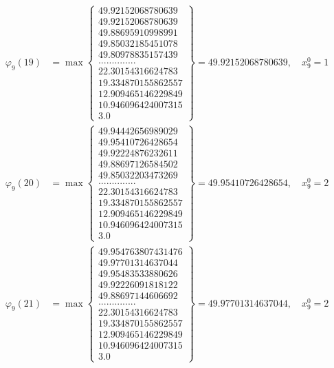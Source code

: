 \documentclass{article}
\begin{document}
\begin{align*}
  
  
  
\varphi_{9}(19) &= \max \left\{ \begin{array}{c}
49.92152068780639 \\
 49.92152068780639 \\
 49.88695910998991 \\
 49.85032185451078 \\
 49.80978835157439 \\
 .............. \\
 22.30154316624783 \\
 19.334870155862557 \\
 12.909465146229849 \\
 10.946096424007315 \\
 3.0
\end{array} \right\} = 49.92152068780639, \quad x_{9}^0 = 1\\
  
  
  
  
\varphi_{9}(20) &= \max \left\{ \begin{array}{c}
49.94442656989029 \\
 49.95410726428654 \\
 49.92224876232611 \\
 49.88697126584502 \\
 49.85032203473269 \\
 .............. \\
 22.30154316624783 \\
 19.334870155862557 \\
 12.909465146229849 \\
 10.946096424007315 \\
 3.0
\end{array} \right\} = 49.95410726428654, \quad x_{9}^0 = 2\\
  
  
  
  
\varphi_{9}(21) &= \max \left\{ \begin{array}{c}
49.954763807431476 \\
 49.97701314637044 \\
 49.95483533880626 \\
 49.92226091818122 \\
 49.88697144606692 \\
 .............. \\
 22.30154316624783 \\
 19.334870155862557 \\
 12.909465146229849 \\
 10.946096424007315 \\
 3.0
\end{array} \right\} = 49.97701314637044, \quad x_{9}^0 = 2\\
  

\end{align*}
\end{document}

